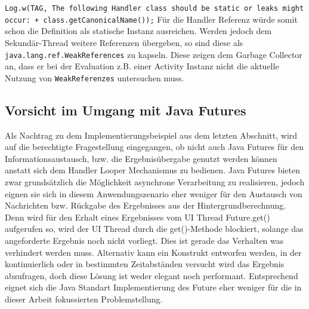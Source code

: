 \documentclass[12pt,oneside,a4paper,bibtotoc,liststotoc]{scrreprt}
\begin{document}
\texttt{Log.w(TAG, \grqq The following Handler class should be static or leaks might occur: \grqq +
               	class.getCanonicalName());}\newline
Für die Handler Referenz würde somit schon die Definition als statische Instanz ausreichen. Werden jedoch dem Sekundär-Thread weitere Referenzen übergeben, so sind diese als \texttt{java.lang.ref.WeakReferences} zu kapseln. Diese zeigen dem Garbage Collector an, dass er bei der Evaluation z.B. einer Activity Instanz nicht die aktuelle Nutzung von \texttt{WeakReferenzes} untersuchen muss.

\subsection{Vorsicht im Umgang mit Java Futures}
Als Nachtrag zu dem Implementierungsbeispiel aus dem letzten Abschnitt, wird auf die berechtigte Fragestellung eingegangen, ob nicht auch Java Futures für den Informationsaustausch, bzw. die Ergebnisübergabe genutzt werden können anstatt sich dem Handler Looper Mechanismus zu bedienen. Java Futures bieten zwar grundsätzlich die Möglichkeit asynchrone Verarbeitung zu realisieren, jedoch eignen sie sich in diesem Anwendungszenario eher weniger für den Austausch von Nachrichten bzw. Rückgabe des Ergebnisses aus der Hintergrundberechnung. Denn wird für den Erhalt eines Ergebnisses vom UI Thread Future.get() aufgerufen so, wird der UI Thread durch die get()-Methode blockiert, solange das angeforderte Ergebnis noch nicht vorliegt. Dies ist gerade das Verhalten was verhindert werden muss. Alternativ kann ein Konstrukt entworfen werden, in der kontinuierlich oder in bestimmten Zeitabständen versucht wird das Ergebnis abzufragen, doch diese Lösung ist weder elegant noch performant. Entsprechend eignet sich die Java Standart Implementierung des Future eher weniger für die in dieser Arbeit fokussierten Problemstellung. 
\end{document}
